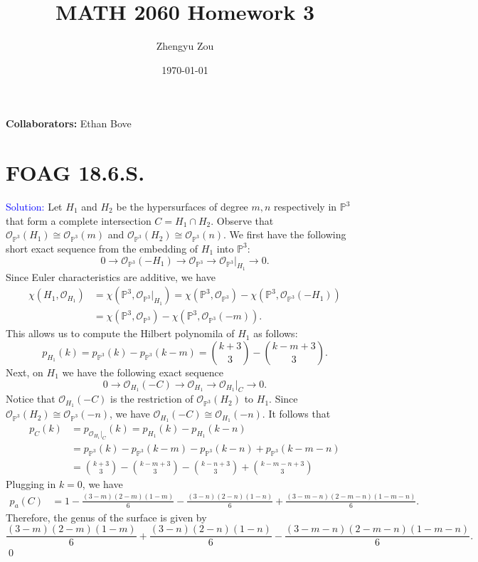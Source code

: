\documentclass[11pt]{article}
\title{MATH 2060 Homework 3}
\author{Zhengyu Zou}
\date{\today}
\newcommand{\PP}{\mathbb{P}}
\newcommand{\cO}{\mathcal{O}}
\newenvironment{solution}{\begin{trivlist}\item[]{\textcolor{blue}{Solution:}}}{\qed \end{trivlist}}
\begin{document}
\maketitle

\textbf{Collaborators:} Ethan Bove

\section*{FOAG 18.6.S.}

\begin{solution}
    Let $H_1$ and $H_2$ be the hypersurfaces of degree $m, n$ respectively in $\PP^3$ that form a complete intersection $C = H_1 \cap H_2$. Observe that $\cO_{\PP^3} (H_1) \cong \cO_{\PP^3}(m)$ and $\cO_{\PP^3}(H_2) \cong \cO_{\PP^3} (n)$. We first have the following short exact sequence from the embedding of $H_1$ into $\PP^3$:
    \[
        0 \longrightarrow \cO_{\PP^3} (-H_1) \longrightarrow \cO_{\PP^3} \longrightarrow \cO_{\PP^3} |_{H_1} \longrightarrow 0.
    \]
    Since Euler characteristics are additive, we have 
    \begin{align*}
        \chi(H_1, \cO_{H_1})
        &= \chi(\PP^3, \cO_{\PP^3}|_{H_1})
        = \chi(\PP^3, \cO_{\PP^3}) - \chi(\PP^3, \cO_{\PP^3}(-H_1)) \\
        &= \chi(\PP^3, \cO_{\PP^3}) - \chi(\PP^3, \cO_{\PP^3}(-m)).
    \end{align*}
    This allows us to compute the Hilbert polynomila of $H_1$ as follows:
    \[
        p_{H_1}(k)
        = p_{\PP^3}(k) - p_{\PP^3}(k - m)
        = \binom{k+3}{3} - \binom{k-m+3}{3}.
    \]
    Next, on $H_1$ we have the following exact sequence 
    \[
        0 \longrightarrow \cO_{H_1} (-C) \longrightarrow \cO_{H_1} \longrightarrow \cO_{H_1} |_{C} \longrightarrow 0.
    \]
    Notice that $\cO_{H_1} (-C)$ is the restriction of $\cO_{\PP^3}(H_2)$ to $H_1$. Since $\cO_{\PP^3} (H_2) \cong \cO_{\PP^3}(-n)$, we have $\cO_{H_1} (-C) \cong \cO_{H_1} (-n)$. 
    It follows that 
    \begin{align*}
        p_{C}(k)
        &= p_{\cO_{H_1}|_C}(k)
        = p_{H_1}(k) - p_{H_1}(k - n) \\
        &= p_{\PP^3}(k) - p_{\PP^3}(k-m) - p_{\PP^3}(k-n) + p_{\PP^3}(k-m-n) \\
        &= \binom{k+3}{3} - \binom{k-m+3}{3} - \binom{k-n+3}{3} + \binom{k-m-n+3}{3}
    \end{align*}
    Plugging in $k = 0$, we have 
    \begin{align*}
        p_a(C)
        &= 1 - \frac{(3 - m)(2-m)(1-m)}{6} - \frac{(3-n)(2-n)(1-n)}{6} + \frac{(3-m-n)(2-m-n)(1-m-n)}{6}.
    \end{align*}
    Therefore, the genus of the surface is given by 
    \[
        \frac{(3 - m)(2-m)(1-m)}{6} + \frac{(3-n)(2-n)(1-n)}{6} - \frac{(3-m-n)(2-m-n)(1-m-n)}{6}.
    \]
\end{solution}
\end{document}
